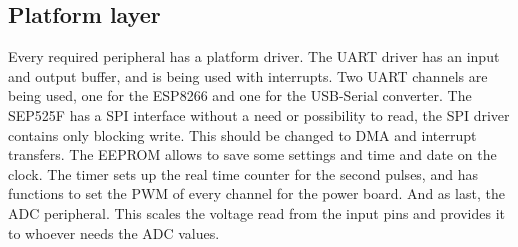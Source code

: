 \subsection{Platform layer}
Every required peripheral has a platform driver. The UART driver has an input and output buffer, and is being used with interrupts. Two UART channels are being used, one for the ESP8266 and one for the USB-Serial converter. The SEP525F has a SPI interface without a need or possibility to read, the SPI driver contains only blocking write. This should be changed to DMA and interrupt transfers. The EEPROM allows to save some settings and time and date on the clock. The timer sets up the real time counter for the second pulses, and has functions to set the PWM of every channel for the power board. And as last, the ADC peripheral. This scales the voltage read from the input pins and provides it to whoever needs the ADC values.